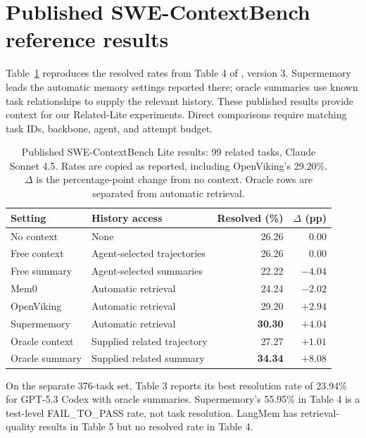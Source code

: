\section{Published SWE-ContextBench reference results}
\label{sec:published-swectx}

Table~\ref{tab:published-swectx-lite} reproduces the resolved rates from
Table 4 of \citet{swecontext2026}, version 3. Supermemory leads the automatic
memory settings reported there; oracle summaries use known task relationships
to supply the relevant history. These published results provide context for
our Related-Lite experiments. Direct comparisons require matching task IDs,
backbone, agent, and attempt budget.

\begin{table}[htbp]
\centering
\small
\caption{Published SWE-ContextBench Lite results: 99 related tasks,
Claude Sonnet 4.5. Rates are copied as reported, including OpenViking's
29.20\%. $\Delta$ is the percentage-point change from no context.
Oracle rows are separated from automatic retrieval.}
\label{tab:published-swectx-lite}
\begin{tabular}{llrr}
\toprule
Setting & History access & Resolved (\%) & $\Delta$ (pp) \\
\midrule
No context & None & 26.26 & 0.00 \\
Free context & Agent-selected trajectories & 26.26 & 0.00 \\
Free summary & Agent-selected summaries & 22.22 & $-4.04$ \\
Mem0 & Automatic retrieval & 24.24 & $-2.02$ \\
OpenViking & Automatic retrieval & 29.20 & $+2.94$ \\
Supermemory & Automatic retrieval & \textbf{30.30} & $+4.04$ \\
\midrule
Oracle context & Supplied related trajectory & 27.27 & $+1.01$ \\
Oracle summary & Supplied related summary & \textbf{34.34} & $+8.08$ \\
\bottomrule
\end{tabular}
\end{table}

On the separate 376-task set, Table 3 reports its best resolution rate of
23.94\% for GPT-5.3 Codex with oracle summaries. Supermemory's 55.95\%
in Table 4 is a test-level FAIL\_TO\_PASS rate, not task resolution.
LangMem has retrieval-quality results in Table 5 but no resolved rate
in Table 4.
